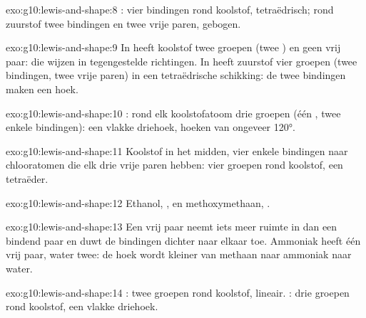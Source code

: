 \begin{solution}{exo:g10:lewis-and-shape:8}
: vier bindingen rond koolstof,
tetraëdrisch; rond zuurstof twee bindingen en twee vrije paren, gebogen.
\end{solution}

\begin{solution}{exo:g10:lewis-and-shape:9}
In  heeft koolstof twee groepen (twee ) en geen
vrij paar: die wijzen in tegengestelde richtingen. In  heeft
zuurstof vier groepen (twee bindingen, twee vrije paren) in een
tetraëdrische schikking: de twee bindingen maken een hoek.
\end{solution}

\begin{solution}{exo:g10:lewis-and-shape:10}
: rond elk koolstofatoom drie
groepen (één , twee enkele bindingen): een vlakke
driehoek, hoeken van ongeveer \ang{120}.
\end{solution}

\begin{solution}{exo:g10:lewis-and-shape:11}
Koolstof in het midden, vier enkele bindingen naar chlooratomen die elk
drie vrije paren hebben: vier groepen rond koolstof, een tetraëder.
\end{solution}

\begin{solution}{exo:g10:lewis-and-shape:12}
Ethanol, , en
methoxymethaan,
.
\end{solution}

\begin{solution}{exo:g10:lewis-and-shape:13}
Een vrij paar neemt iets meer ruimte in dan een bindend paar en duwt de
bindingen dichter naar elkaar toe. Ammoniak heeft één vrij paar, water
twee: de hoek wordt kleiner van methaan naar ammoniak naar water.
\end{solution}

\begin{solution}{exo:g10:lewis-and-shape:14}
: twee groepen rond koolstof, lineair.
: drie groepen rond koolstof, een vlakke
driehoek.
\end{solution}


